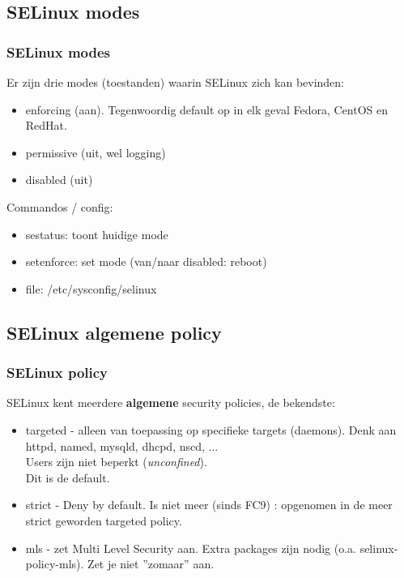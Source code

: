 \subsection{SELinux modes}
\begin{frame}
    \frametitle{SELinux modes}
Er zijn drie modes (toestanden) waarin SELinux zich kan bevinden:
\begin{itemize}
\pause
\item enforcing (aan). Tegenwoordig default op in elk geval Fedora, CentOS en RedHat.
\pause
\item permissive (uit, wel logging)
\pause
\item disabled (uit)
\end{itemize}
Commandos / config:
\begin{itemize}
\pause
\item sestatus: toont huidige mode
\pause
\item setenforce: set mode (van/naar disabled: reboot)
\pause
\item file: /etc/sysconfig/selinux
\end{itemize}
\end{frame}

\subsection{SELinux {\bf algemene} policy}
\begin{frame}
	\frametitle{SELinux policy}
\pause
SELinux kent meerdere {\bf algemene} security policies, de bekendste:
\begin{itemize}
	\pause
 	\item targeted - alleen van toepassing op specifieke targets (daemons). Denk aan httpd, named, mysqld, dhcpd, nscd, ... \\
Users zijn niet beperkt ({\it unconfined}). \\
Dit is de default.
	\pause
	\item strict - Deny by default. Is niet meer (sinds FC9) : opgenomen in de meer strict geworden targeted policy.
	\pause
	\item mls - zet Multi Level Security aan. Extra packages zijn nodig (o.a. selinux-policy-mls). Zet je niet ''zomaar'' aan.
\end{itemize}
\end{frame}

